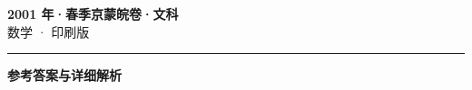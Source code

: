\documentclass[zihao=5, a4paper]{ctexart}
\begin{document}
\begin{center}
  {\Large\bfseries 2001 年·春季京蒙皖卷·文科}\\[4pt]
  {\large 数学 · 印刷版}
\end{center}
\medskip
{}

\par\bigskip\hrule\bigskip
{}
\begin{center}{\large\bfseries 参考答案与详细解析}\end{center}
\smallskip

\end{document}
